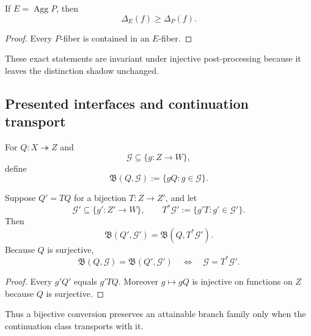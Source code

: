 \begin{proposition}\label{prop:aggregation-resolution-v13}
If $E=\operatorname{Agg}P$, then
\[
\boxed{\Delta_E(f)\ge\Delta_P(f).}
\]
\end{proposition}

\begin{proof}
Every $P$-fiber is contained in an $E$-fiber.
\end{proof}

These exact statements are invariant under injective post-processing because it leaves the distinction shadow unchanged.

\subsection{Presented interfaces and continuation transport}

\begin{definition}\label{def:attainable-branch-family-v13}
For $Q:X\twoheadrightarrow Z$ and
\[
\mathcal G\subseteq\{g:Z\to W\},
\]
define
\[
\boxed{
\mathfrak B(Q,\mathcal G)
:=\{gQ:g\in\mathcal G\}.
}
\]
\end{definition}

\begin{theorem}\label{thm:continuation-transport-v13}
Suppose $Q'=TQ$ for a bijection $T:Z\to Z'$, and let
\[
\mathcal G'\subseteq\{g':Z'\to W\},
\qquad
T^*\mathcal G':=\{g'T:g'\in\mathcal G'\}.
\]
Then
\[
\boxed{
\mathfrak B(Q',\mathcal G')
=
\mathfrak B(Q,T^*\mathcal G').
}
\]
Because $Q$ is surjective,
\[
\boxed{
\mathfrak B(Q,\mathcal G)
=
\mathfrak B(Q',\mathcal G')
\quad\Longleftrightarrow\quad
\mathcal G=T^*\mathcal G'.
}
\]
\end{theorem}

\begin{proof}
Every $g'Q'$ equals $g'TQ$. Moreover $g\mapsto gQ$ is injective on functions on $Z$ because $Q$ is surjective.
\end{proof}

Thus a bijective conversion preserves an attainable branch family only when the continuation class transports with it.

